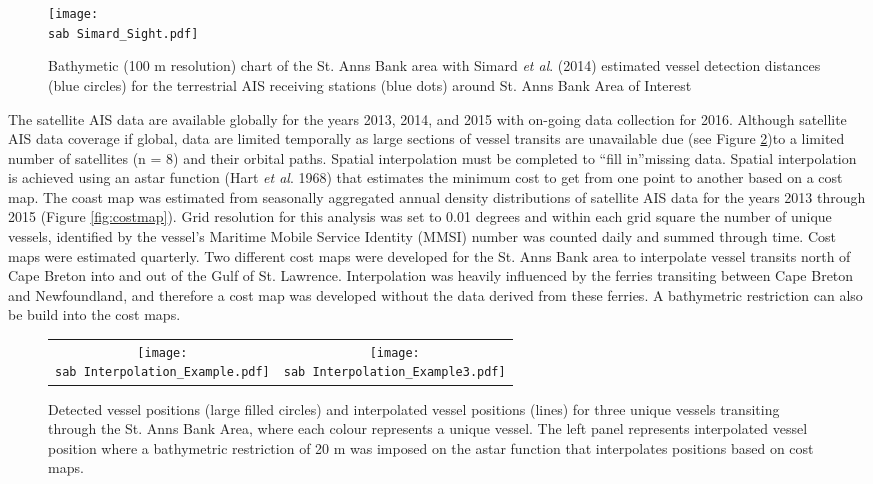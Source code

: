 \documentclass[letterpaper,portrait,11pt]{scrartcl}
\numberwithin{equation}{section}		%
\numberwithin{figure}{section}			%
\numberwithin{table}{section}				%
\newcommand{\ecomod}{\string~/ecomod_data/}   %
\newcommand{\sab}{\ecomod/mpa/sab/}   %
\begin{document}
\begin{itemize*}
\begin{figure}[h]
	\centering
	\texttt{[image: \\sab Simard\_Sight.pdf]}
	\caption{Bathymetic (100 m resolution) chart of the  St. Anns Bank area with Simard \textit{et al}. (2014) estimated vessel detection distances (blue circles) for the terrestrial AIS receiving stations (blue dots) around St. Anns Bank Area of Interest}
	\label{fig:DetAIS}
\end{figure}


The satellite AIS data are available globally for the years 2013, 2014, and 2015 with on-going data collection for 2016. Although satellite AIS data coverage if global, data are limited temporally as large sections of vessel transits are unavailable due (see Figure \ref{fig:astar})to a limited number of satellites (n = 8) and their orbital paths.  Spatial interpolation must be completed to \textquotedblleft fill in\textquotedblright  missing data.  Spatial interpolation is achieved using an astar function (Hart \textit{et al}. 1968)  that estimates the minimum cost to get from one point to another based on a cost map.  The coast map was estimated from seasonally aggregated annual density distributions of satellite AIS data for the years 2013 through 2015 (Figure \ref{fig:costmap}).  Grid resolution for this analysis was set to 0.01 degrees and within each grid square the number of unique vessels, identified by the vessel’s Maritime Mobile Service Identity (MMSI) number was counted daily and summed through time.  Cost maps were estimated quarterly.  Two different cost maps were developed for the St. Anns Bank area to interpolate vessel transits north of Cape Breton into and out of the Gulf of St. Lawrence.  Interpolation was heavily influenced by the ferries transiting between Cape Breton and Newfoundland, and therefore a cost map was developed without the data derived from these ferries.  A bathymetric restriction can also be build into the cost maps.

\begin{figure}[h]
	\centering
	\begin{tabular}{cc}
	\texttt{[image: \\sab Interpolation\_Example.pdf]} &
    \texttt{[image: \\sab Interpolation\_Example3.pdf]}
	\end{tabular}
	\caption{Detected vessel positions (large filled circles) and interpolated vessel positions (lines) for three unique vessels transiting through the St. Anns Bank Area, where each colour represents a unique vessel. The left panel represents interpolated vessel position where a bathymetric restriction of 20 m was imposed on the astar function that interpolates positions based on cost maps.}
	\label{fig:astar}
\end{figure}



\end{itemize*}
\end{document}
